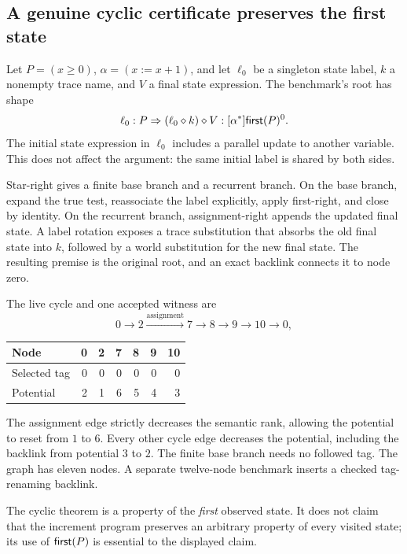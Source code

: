 \subsection{A genuine cyclic certificate preserves the first state}
Let $P=(x\ge0)$, $\alpha=(x:=x+1)$, and let $\ell_0$ be a singleton state
label, $k$ a nonempty trace name, and $V$ a final state expression. The
benchmark's root has shape
\[
 \ell_0:P\Rightarrow (\ell_0\mathbin{\diamond} k)\mathbin{\diamond} V:[\alpha^*]\mathsf{first}(P)^{0}.
\]
The initial state expression in $\ell_0$ includes a parallel update to
another variable. This does not affect the argument: the same initial
label is shared by both sides.

Star-right gives a finite base branch and a recurrent branch. On the base
branch, expand the true test, reassociate the label explicitly, apply
first-right, and close by identity. On the recurrent branch, assignment-right
appends the updated final state. A label rotation exposes a trace
substitution that absorbs the old final state into $k$, followed by a world
substitution for the new final state. The resulting premise is the original
root, and an exact backlink connects it to node zero.

The live cycle and one accepted witness are
\[
 0\longrightarrow2\mathrel{\mathop{\longrightarrow}\limits^{\text{assignment}}}7
 \longrightarrow8\longrightarrow9\longrightarrow10\longrightarrow0,
\]
\begin{center}
\begin{tabular}{@{}lrrrrrr@{}}
\toprule
Node & 0 & 2 & 7 & 8 & 9 & 10\\
\midrule
Selected tag & 0 & 0 & 0 & 0 & 0 & 0\\
Potential & 2 & 1 & 6 & 5 & 4 & 3\\
\bottomrule
\end{tabular}
\end{center}
The assignment edge strictly decreases the semantic rank, allowing the
potential to reset from $1$ to $6$. Every other cycle edge decreases the
potential, including the backlink from potential $3$ to $2$. The finite base
branch needs no followed tag. The graph has eleven nodes. A separate
twelve-node benchmark inserts a checked tag-renaming backlink.

The cyclic theorem is a property of the \emph{first} observed state. It does
not claim that the increment program preserves an arbitrary property of
every visited state; its use of $\mathsf{first}(P)$ is essential to the displayed claim.


